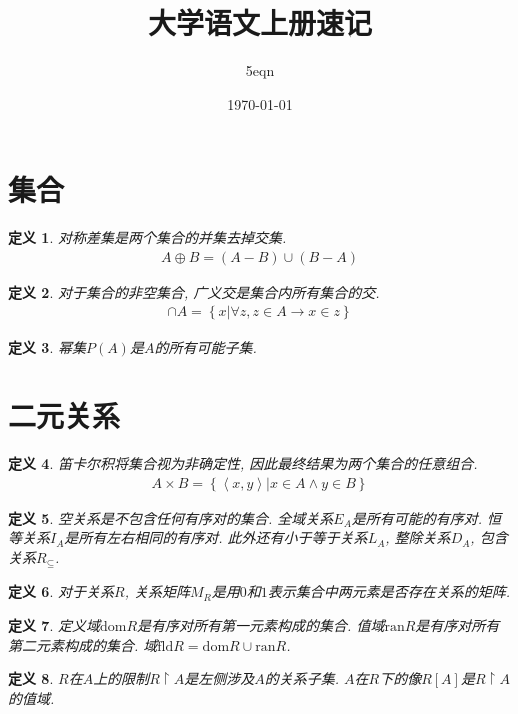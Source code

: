 \documentclass[UTF8,a4paper,11pt]{ctexart}
\title{大学语文上册速记}
\author{5eqn}
\date{\today}
\newtheorem{definition}{定义}
\begin{document}
  \maketitle
  \section{集合}
    \begin{definition}
      对称差集是两个集合的并集去掉交集.
      \[
      \begin{aligned}
        A\oplus B=\left(A-B\right)\cup \left(B-A\right)
      \end{aligned}
      \]

    \end{definition}
    \begin{definition}
      对于集合的非空集合, 广义交是集合内所有集合的交.
      \[
      \begin{aligned}
        \cap A=\left\{x|\forall z, z\in A \to x\in z\right\}
      \end{aligned}
      \]
      
    \end{definition}
    \begin{definition}
      幂集$P\left(A\right)$是$A$的所有可能子集.
    \end{definition}
  \section{二元关系}
    \begin{definition}
      笛卡尔积将集合视为非确定性, 因此最终结果为两个集合的任意组合.
      \[
      \begin{aligned}
        A\times B=\left\{\left<x, y\right>|x\in A \wedge y\in B\right\}
      \end{aligned}
      \]
      
    \end{definition}
    \begin{definition}
      空关系是不包含任何有序对的集合. 
      全域关系$E_A$是所有可能的有序对.
      恒等关系$I_A$是所有左右相同的有序对.
      此外还有小于等于关系$L_A$,
      整除关系$D_A$,
      包含关系$R_\subseteq$.
    \end{definition}
    \begin{definition}
      对于关系$R$, 
      关系矩阵$M_R$是用$0$和$1$表示集合中两元素是否存在关系的矩阵.
    \end{definition}
    \begin{definition}
      定义域$\mathrm{dom}R$是有序对所有第一元素构成的集合.
      值域$\mathrm{ran}R$是有序对所有第二元素构成的集合.
      域$\mathrm{fld}R=\mathrm{dom}R\cup \mathrm{ran}R$.
    \end{definition}
    \begin{definition}
      $R$在$A$上的限制$R\upharpoonright A$是左侧涉及$A$的关系子集.
      $A$在$R$下的像$R[A]$是$R\upharpoonright A$的值域.
    \end{definition}
\end{document}
